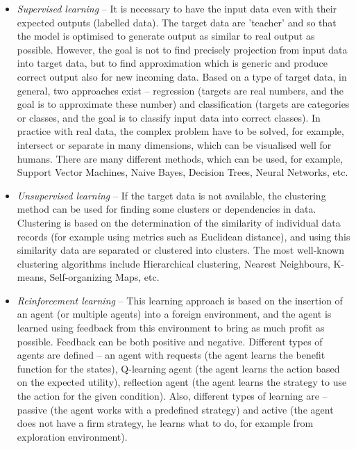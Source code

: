 \documentclass[thesis=M,english]{FITthesis}[2012/10/20]
\begin{document}
\begin{itemize}

\item \textit{Supervised learning} -- It is necessary to have the input data even with their expected outputs (labelled data). The target data are 'teacher' and so that the model is optimised to generate output as similar to real output as possible.\cite[xii]{Hastie2001statisticallearning} However, the goal is not to find precisely projection from input data into target data, but to find approximation which is generic and produce correct output also for new incoming data. Based on a type of target data, in general, two approaches exist -- regression (targets are real numbers, and the goal is to approximate these number) and classification (targets are categories or classes, and the goal is to classify input data into correct classes). In practice with real data, the complex problem have to be solved, for example, intersect or separate in many dimensions, which can be visualised well for humans. There are many different methods, which can be used, for example, Support Vector Machines, Naive Bayes, Decision Trees, Neural Networks, etc.

\item \textit{Unsupervised learning} -- If the target data is not available, the clustering method can be used for finding some clusters or dependencies in data.\cite[xii]{Hastie2001statisticallearning} Clustering is based on the determination of the similarity of individual data records (for example using metrics such as Euclidean distance), and using this similarity data are separated or clustered into clusters. The most well-known clustering algorithms include Hierarchical clustering, Nearest Neighbours, K-means, Self-organizing Maps, etc.

\item \textit{Reinforcement learning} -- This learning approach is based on the insertion of an agent (or multiple agents) into a foreign environment, and the agent is learned using feedback from this environment to bring as much profit as possible.\cite[4]{Sutton1998reinforcement} Feedback can be both positive and negative. Different types of agents are defined -- an agent with requests (the agent learns the benefit function for the states),  Q-learning agent (the agent learns the action based on the expected utility), reflection agent (the agent learns the strategy to use the action for the given condition). Also, different types of learning are  -- passive (the agent works with a predefined strategy) and active (the agent does not have a firm strategy, he learns what to do, for example from exploration environment). 

\end{itemize}
\end{document}
